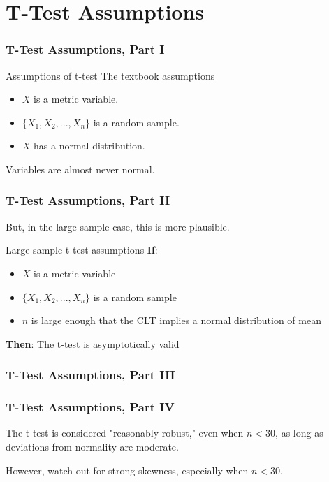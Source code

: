\documentclass[12pt, block=fill]{beamer}
\begin{document}
\section{T-Test Assumptions}

\begin{frame}
  \frametitle{T-Test Assumptions, Part I}

  \begin{block}{Assumptions of t-test}
    The textbook assumptions
    
    \begin{itemize}
    \item $X$ is a metric variable.
    \item $\{X_1,X_2,...,X_n\}$ is a random sample.
    \item $X$ has a normal distribution.
    \end{itemize}
    \end{block} 
    
    Variables are almost never normal.
\end{frame}

\begin{frame}
  \frametitle{T-Test Assumptions, Part II}
  
  But, in the large sample case, this is more plausible.

  \begin{block}{Large sample t-test assumptions} 
    \textbf{If}: 
    \begin{itemize}
    \item $X$ is a metric variable
    \item $\{X_1,X_2,...,X_n\}$ is a random sample
    \item $n$ is large enough that the CLT implies a normal distribution of mean
    \end{itemize}
    \textbf{Then}: The t-test is asymptotically valid
    \end{block} 
\end{frame}

\begin{frame}
  \frametitle{T-Test Assumptions, Part III}
  
\end{frame} 

\begin{frame}
  \frametitle{T-Test Assumptions, Part IV}
  
  The t-test is considered "reasonably robust," even when $n<30$, as
  long as deviations from normality are moderate.

  However, watch out for strong skewness, especially when $n<30$.

\end{frame}
\end{document}
